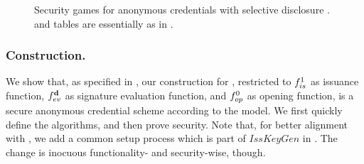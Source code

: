\begin{figure}[ht!]
  \centering
  \caption{Security games for anonymous credentials with selective disclosure
    \cite{fhs19}. \OWNR and \ATTR tables are essentially as in
    .}
  \label{fig:model-ac}  
\end{figure}

\subsubsection{\CUASAC Construction.} %
We show that, as specified in , our \CUASGen
construction for \UAS, restricted to $f_{is}^1$ as issuance function,
$f_{ev}^{\mathbf{d}}$ as signature evaluation function, and $f_{op}^0$ as opening
function, is a secure anonymous credential scheme according to the \cite{fhs19}
model. We first quickly define the algorithms, and then prove security. Note
that, for better alignment with \UAS, we add a common setup process which is
part of $IssKeyGen$ in \cite{fhs19}. The change is inocuous functionality- and
security-wise, though.

